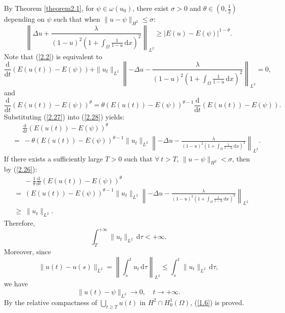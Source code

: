 \documentclass[10pt,a4paper]{amsart}
\begin{document}
    By Theorem \ref{theorem2.1}, for $\psi\in\omega(u_0)$, there exist $\sigma>0$ and $\theta\in (0,\frac{1}{2})$ depending on $\psi$ such that when $\|u-\psi\|_{H^2}\le\sigma$:
    \begin{equation}
        \left\|\Delta u+\frac{\lambda}{(1-u)^2(1+\int_{\Omega}\frac{1}{1-u}\,\mathrm{d}x)^2}\right\|_{L^{2}}\ge |E(u)-E(\psi)|^{1-\theta}.\label{2.26}
    \end{equation}
    Note that (\ref{2.2}) is equivalent to
    \begin{equation}
        \frac{\mathrm{d}}{\mathrm{d}t}(E(u(t))-E(\psi))+\|u_t\|_{L^2}\left\|-\Delta u-\frac{\lambda}{(1-u)^2(1+\int_{\Omega}\frac{1}{1-u}\,\mathrm{d}x)^2}\right\|_{L^2}=0,\label{2.27}
    \end{equation}
    and
    \begin{equation}
        \frac{\mathrm{d}}{\mathrm{d}t}(E(u(t))-E(\psi))^{\theta}=\theta(E(u(t))-E(\psi))^{\theta-1} \frac{\mathrm{d}}{\mathrm{d}t}(E(u(t))-E(\psi)).\label{2.28}
    \end{equation}
    Substituting (\ref{2.27}) into (\ref{2.28}) yields:
    \begin{equation}
        \begin{aligned}
            &\quad\ \ \frac{\mathrm{d}}{\mathrm{d}t}(E(u(t))-E(\psi))^{\theta}\\
            &=\ -\theta(E(u(t))-E(\psi))^{\theta-1}\|u_t\|_{L^2}\left\|-\Delta u-\frac{\lambda}{(1-u)^2(1+\int_{\Omega}\frac{1}{1-u}\,\mathrm{d}x)^2}\right\|_{L^2}.
        \end{aligned}\label{2.29}
    \end{equation}
    If there exists a sufficiently large $T>0$ such that $\forall\ t>T$, $\|u-\psi\|_{H^2}<\sigma$, then by (\ref{2.26}):
    \begin{align*}
        &\quad\ \ -\frac{1}{\theta}\frac{\mathrm{d}}{\mathrm{d}t}(E(u(t))-E(\psi))^{\theta}\\
        &=\ (E(u(t))-E(\psi))^{\theta-1}\|u_t\|_{L^2}\left\|-\Delta u-\frac{\lambda}{(1-u)^2(1+\int_{\Omega}\frac{1}{1-u}\,\mathrm{d}x)^2}\right\|_{L^2}\\
        &\ge\ \|u_t\|_{L^2}.
    \end{align*}
    Therefore,
    $$\int_{T}^{+\infty}\|u_t\|_{L^2}\,\mathrm{d}\tau <+\infty.$$
    Moreover, since
    $$\|u(t)-u(s)\|_{L^2}=\left\|\int_{s}^{t}u_t\,\mathrm{d}\tau\right\|_{L^2}\le \int_{s}^{t}\|u_t\|_{L^2}\,\mathrm{d}\tau,$$
    we have
    $$\|u(t)-\psi\|_{L^2}\to 0,\quad t\to +\infty.$$
    By the relative compactness of $\bigcup_{t\ge T}u(t)$ in $H^2\cap H_0^1(\Omega)$, (\ref{1.6}) is proved.
\end{document}
